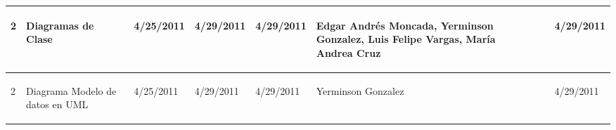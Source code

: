 \begin{center}
\begin{longtable}{|p{}|p{}|p{}|p{}|p{}|p{}|p{}|p{}|}
{\begin{center} 2 \end{center}} & 
{\begin{center} Diagramas de Clase \end{center}} & 
{\begin{center} 4/25/2011 \end{center}} & 
{\begin{center} 4/29/2011 \end{center}} & 
{\begin{center} 4/29/2011 \end{center}} & 
{\begin{center} Edgar Andrés Moncada, Yerminson Gonzalez, Luis Felipe Vargas, María Andrea Cruz \end{center}} & 
{\begin{center}  \end{center}} & 
{\begin{center} 4/29/2011 \end{center}}\\
\hline

{\begin{center} 2 \end{center}} & 
{\begin{center} Diagrama Modelo de datos en UML \end{center}} & 
{\begin{center} 4/25/2011 \end{center}} & 
{\begin{center} 4/29/2011 \end{center}} & 
{\begin{center} 4/29/2011 \end{center}} & 
{\begin{center} Yerminson Gonzalez \end{center}} & 
{\begin{center}  \end{center}} & 
{\begin{center} 4/29/2011 \end{center}}\\
\hline	


\end{longtable}
\end{center}
